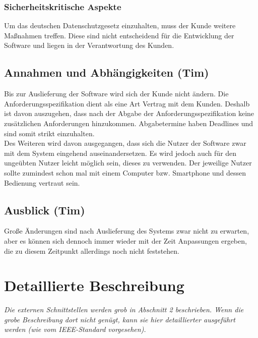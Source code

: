 \documentclass[fontsize=12pt,paper=a4,twoside]{scrartcl}
\begin{document}
\subsubsection{Sicherheitskritische Aspekte} \label{subsubsec:SicherheitsAspekte} Um das deutschen Datenschutzgesetz einzuhalten, muss der Kunde weitere Maßnahmen treffen. Diese sind nicht entscheidend für die Entwicklung der Software und liegen in der Verantwortung des Kunden.

\subsection{Annahmen und Abhängigkeiten (Tim)} \label{subsec:Annahmen} Bis zur Auslieferung der Software wird sich der Kunde nicht ändern. Die Anforderungsspezifikation dient als eine Art Vertrag mit dem Kunden. Deshalb ist davon auszugehen, dass nach der Abgabe der Anforderungsspezifikation keine zusätzlichen Anforderungen hinzukommen. Abgabetermine haben Deadlines und sind somit strikt einzuhalten.\\
Des Weiteren wird davon ausgegangen, dass sich die Nutzer der Software zwar mit dem System eingehend auseinandersetzen. Es wird jedoch auch für den ungeübten Nutzer leicht möglich sein, dieses zu verwenden. Der jeweilige Nutzer sollte zumindest schon mal mit einem Computer bzw. Smartphone und dessen Bedienung vertraut sein.\\


\subsection{Ausblick (Tim)} \label{subsec:Ausblick} Große Änderungen sind nach Auslieferung des Systems zwar nicht zu erwarten, aber es können sich dennoch immer wieder mit der Zeit Anpassungen ergeben, die zu diesem Zeitpunkt allerdings noch nicht feststehen.

\section{Detaillierte Beschreibung}
\label{ch:DetaillierteBeschreibung}
{\em Die externen Schnittstellen werden grob in Abschnitt 2
  beschrieben.  Wenn die grobe Beschreibung dort nicht genügt, kann
  sie hier detaillierter ausgeführt werden (wie vom IEEE-Standard
  vorgesehen).}
\end{document}

